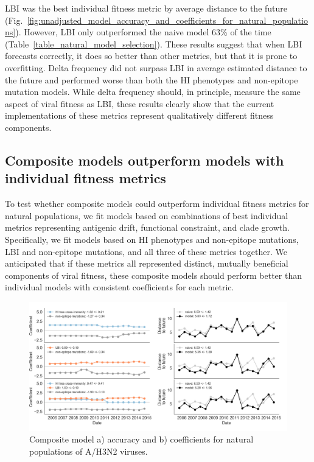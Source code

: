 LBI was the best individual fitness metric by average distance to the future (Fig.~\ref{fig:unadjusted_model_accuracy_and_coefficients_for_natural_populations}).
However, LBI only outperformed the naive model 63\% of the time (Table~\ref{table_natural_model_selection}).
These results suggest that when LBI forecasts correctly, it does so better than other metrics, but that it is prone to overfitting.
Delta frequency did not surpass LBI in average estimated distance to the future and performed worse than both the HI phenotypes and non-epitope mutation models.
While delta frequency should, in principle, measure the same aspect of viral fitness as LBI, these results clearly show that the current implementations of these metrics represent qualitatively different fitness components.

\subsection*{Composite models outperform models with individual fitness metrics}

To test whether composite models could outperform individual fitness metrics for natural populations, we fit models based on combinations of best individual metrics representing antigenic drift, functional constraint, and clade growth.
Specifically, we fit models based on HI phenotypes and non-epitope mutations, LBI and non-epitope mutations, and all three of these metrics together.
We anticipated that if these metrics all represented distinct, mutually beneficial components of viral fitness, these composite models should perform better than individual models with consistent coefficients for each metric.

\begin{figure}[t]
  \begin{center}
  \includegraphics[width=\textwidth]{figures/best-composite-unadjusted-model-accuracy-and-coefficients-for-natural-populations.png}
  \caption{Composite model a) accuracy and b) coefficients for natural populations of A/H3N2 viruses.}
  \label{fig:unadjusted_composite_model_accuracy_and_coefficients_for_natural_populations}
  \end{center}
\end{figure}

